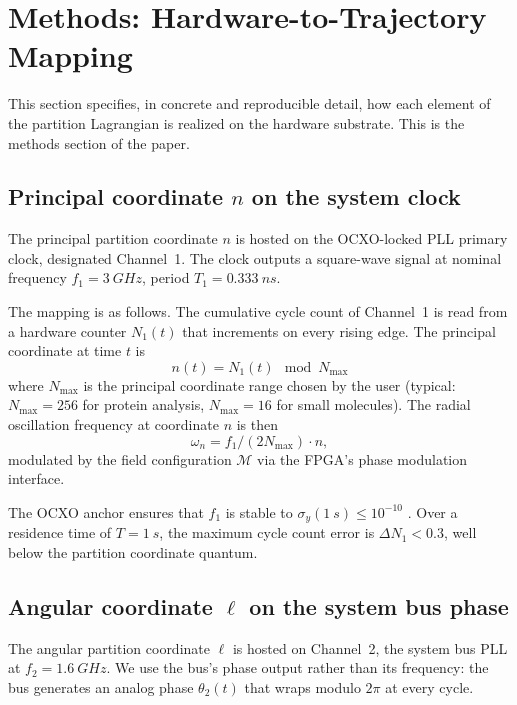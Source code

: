 \documentclass[twocolumn,11pt,a4paper]{article}
\theoremstyle{definition}
\theoremstyle{remark}
\newcommand{\Depth}{\mathcal{M}}
\begin{document}
\section{Methods: Hardware-to-Trajectory Mapping}
\label{sec:methods}

This section specifies, in concrete and reproducible detail, how each element of the partition Lagrangian is realized on the hardware substrate. This is the methods section of the paper.

\subsection{Principal coordinate $n$ on the system clock}

The principal partition coordinate $n$ is hosted on the OCXO-locked PLL primary clock, designated Channel~1. The clock outputs a square-wave signal at nominal frequency $f_1 = \SI{3}{GHz}$, period $T_1 = \SI{0.333}{ns}$.

The mapping is as follows. The cumulative cycle count of Channel~1 is read from a hardware counter $N_1(t)$ that increments on every rising edge. The principal coordinate at time $t$ is
\begin{equation}
    n(t) = N_1(t) \mod N_{\max}
    \label{eq:n-map}
\end{equation}
where $N_{\max}$ is the principal coordinate range chosen by the user (typical: $N_{\max} = 256$ for protein analysis, $N_{\max} = 16$ for small molecules). The radial oscillation frequency at coordinate $n$ is then
\begin{equation}
    \omega_n = f_1 / (2 N_{\max}) \cdot n,
\end{equation}
modulated by the field configuration $\Depth$ via the FPGA's phase modulation interface.

The OCXO anchor ensures that $f_1$ is stable to $\sigma_y(\SI{1}{s}) \le 10^{-10}$ \citep{vig1999}. Over a residence time of $T = \SI{1}{s}$, the maximum cycle count error is $\Delta N_1 < 0.3$, well below the partition coordinate quantum.

\subsection{Angular coordinate $\ell$ on the system bus phase}

The angular partition coordinate $\ell$ is hosted on Channel~2, the system bus PLL at $f_2 = \SI{1.6}{GHz}$. We use the bus's phase output rather than its frequency: the bus generates an analog phase $\theta_2(t)$ that wraps modulo $2\pi$ at every cycle.
\end{document}
